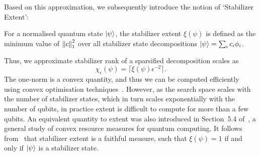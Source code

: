 Based on this approximation, we subsequently introduce the notion of `Stabilizer Extent':
\begin{defn}
For a normalised quantum state $\ket{\psi}$, the stabilizer extent $\xi\left(\psi\right)$ is defined as the minimum value of $\norm{c}^{2}_{1}$ over all stabilizer state decompositions $\ket{\psi}=\sum_{i}c_{i}\phi_{i}$.
\end{defn}
Thus, we approximate stabilizer rank of a sparsified decomposition scales as
\begin{equation}
\chi_{\epsilon}\left(\psi\right)=\lceil \xi\left(\psi\right)\epsilon^{-2}\rceil.
\label{eq:extent_srank}
\end{equation}
The one-norm is a convex quantity, and thus we can be computed efficiently using convex optimisation techniques~\cite{Boyd2004}. However, as the search space scales with the number of stabilizer states, which in turn scales exponentially with the number of qubits, in practice extent is difficult to compute for more than a few qubits. An equivalent quantity to extent was also introduced in Section~5.4 of~\cite{Regula2018}, a general study of convex resource measures for quantum computing. It follows from~\cite{Regula2018} that stabilizer extent is a faithful measure, such that $\xi\left(\psi\right)=1$ if and only if $\ket{\psi}$ is a stabilizer state.

